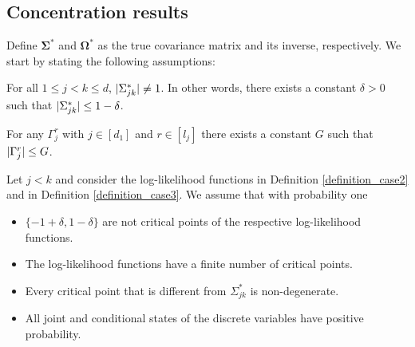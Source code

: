 \subsection{Concentration results}\label{sec::convergence_results}

Define \(\mathbf{\Sigma}^*\) and \(\mathbf{\Omega}^*\) as the true covariance matrix and its inverse, respectively. We start by stating the following assumptions:

\begin{assumption}\label{ass1}
    For all $1 \leq j < k \leq d$, $\lvert\Sigma_{jk}^*\rvert \neq 1$. In other words, there exists a constant $\delta > 0$ such that $\lvert\Sigma_{jk}^*\rvert \leq 1 - \delta$.
\end{assumption}

\begin{assumption}\label{ass2}
    For any $\Gamma_j^r$ with $j \in [d_1]$ and $r \in [l_{j}]$ there exists a constant $G$ such that $\lvert\Gamma_j^r\rvert \leq G$.
\end{assumption}

\begin{assumption}\label{ass3}
    Let $j < k$ and consider the log-likelihood functions in Definition \ref{definition_case2} and in Definition \ref{definition_case3}. We assume that with probability one
    \begin{itemize}
        \item $\{-1+\delta, 1 - \delta\}$ are not critical points of the respective log-likelihood functions.
        \item The log-likelihood functions have a finite number of critical points.
        \item Every critical point that is different from $\Sigma_{jk}^*$ is non-degenerate.
        \item All joint and conditional states of the discrete variables have positive probability.
    \end{itemize}
\end{assumption}


